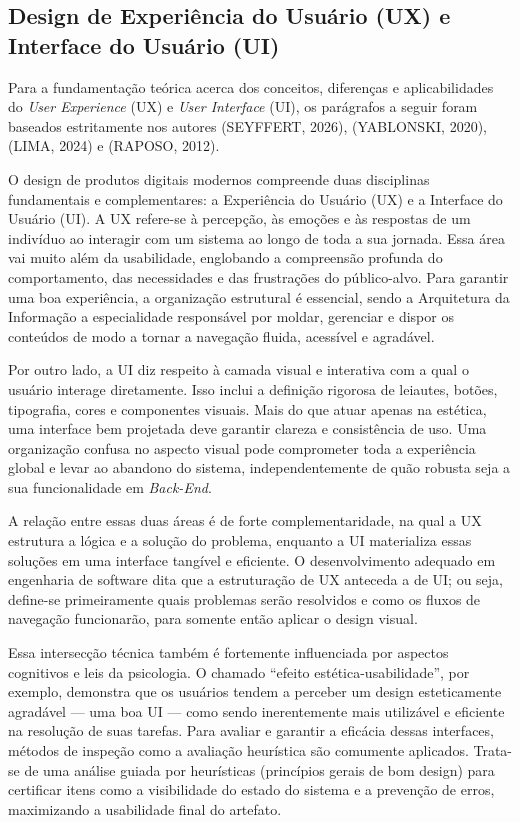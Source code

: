 \subsection{Design de Experiência do Usuário (UX) e Interface do Usuário (UI)}

Para a fundamentação teórica acerca dos conceitos, diferenças e aplicabilidades do \textit{User Experience} (UX) e \textit{User Interface} (UI), os parágrafos a seguir foram baseados estritamente nos autores (SEYFFERT, 2026), (YABLONSKI, 2020), (LIMA, 2024) e (RAPOSO, 2012).

O design de produtos digitais modernos compreende duas disciplinas fundamentais e complementares: a Experiência do Usuário (UX) e a Interface do Usuário (UI). A UX refere-se à percepção, às emoções e às respostas de um indivíduo ao interagir com um sistema ao longo de toda a sua jornada. Essa área vai muito além da usabilidade, englobando a compreensão profunda do comportamento, das necessidades e das frustrações do público-alvo. Para garantir uma boa experiência, a organização estrutural é essencial, sendo a Arquitetura da Informação a especialidade responsável por moldar, gerenciar e dispor os conteúdos de modo a tornar a navegação fluida, acessível e agradável.

Por outro lado, a UI diz respeito à camada visual e interativa com a qual o usuário interage diretamente. Isso inclui a definição rigorosa de leiautes, botões, tipografia, cores e componentes visuais. Mais do que atuar apenas na estética, uma interface bem projetada deve garantir clareza e consistência de uso. Uma organização confusa no aspecto visual pode comprometer toda a experiência global e levar ao abandono do sistema, independentemente de quão robusta seja a sua funcionalidade em \textit{Back-End}.

A relação entre essas duas áreas é de forte complementaridade, na qual a UX estrutura a lógica e a solução do problema, enquanto a UI materializa essas soluções em uma interface tangível e eficiente. O desenvolvimento adequado em engenharia de software dita que a estruturação de UX anteceda a de UI; ou seja, define-se primeiramente quais problemas serão resolvidos e como os fluxos de navegação funcionarão, para somente então aplicar o design visual.

Essa intersecção técnica também é fortemente influenciada por aspectos cognitivos e leis da psicologia. O chamado ``efeito estética-usabilidade'', por exemplo, demonstra que os usuários tendem a perceber um design esteticamente agradável --- uma boa UI --- como sendo inerentemente mais utilizável e eficiente na resolução de suas tarefas. Para avaliar e garantir a eficácia dessas interfaces, métodos de inspeção como a avaliação heurística são comumente aplicados. Trata-se de uma análise guiada por heurísticas (princípios gerais de bom design) para certificar itens como a visibilidade do estado do sistema e a prevenção de erros, maximizando a usabilidade final do artefato.

